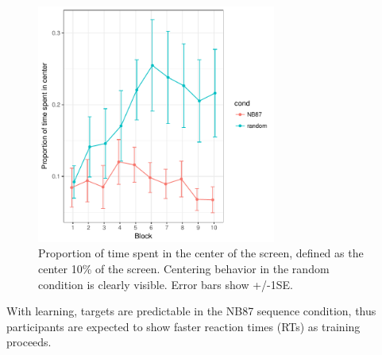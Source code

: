 \documentclass[man,floatsintext]{apa6}
\begin{document}
\begin{figure}[!h]
  \centering
  \includegraphics[width=0.7\textwidth]{figures/centering_behavior}
  \caption{Proportion of time spent in the center of the screen, defined as the center 10\% of the screen. Centering behavior in the random condition is clearly visible. Error bars show +/-1SE.}
  \label{fig:centering}
\end{figure} 


With learning, targets are predictable in the NB87 sequence condition, thus participants are expected to show faster reaction times (RTs) as training proceeds.
\end{document}
